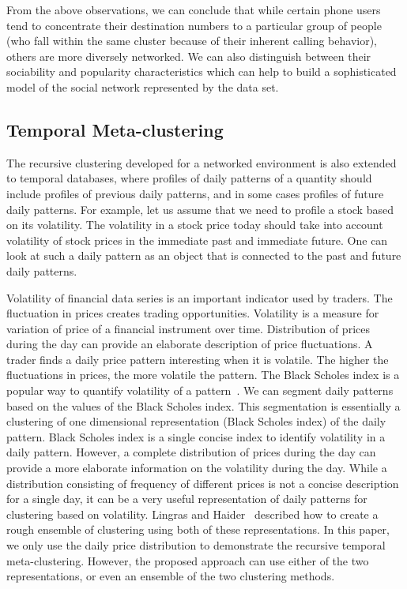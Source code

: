 \documentclass[oribibl]{llncs}
\begin{document}
From the above observations, we can conclude that while certain 
phone users tend to concentrate their destination numbers to 
a particular group of people (who fall within the same cluster 
because of their inherent calling behavior), others are more
diversely networked. We can also distinguish between their sociability
and popularity characteristics which can help to build a sophisticated
model of the social network represented by the data set. 

\subsection{Temporal Meta-clustering}
The recursive clustering developed for a networked environment is also extended to temporal databases, where profiles of daily patterns of a quantity should include profiles of previous daily patterns, and in some cases profiles of future daily patterns. For example, let us assume that we need to profile a stock based on its volatility. The volatility in a stock price today should take into account volatility of stock prices in the immediate past and immediate future. One can look at such a daily pattern as an object that is connected to the past and future daily patterns. 

Volatility of financial data series is an important indicator used by traders. The fluctuation in prices creates trading opportunities.  Volatility is a measure for variation of price of a financial instrument over time. Distribution of prices during the day can provide an elaborate description of price fluctuations.
A trader finds a daily price pattern interesting when it is volatile.
The higher the fluctuations in prices, the
more volatile the pattern.
The Black Scholes index is a popular way to quantify volatility of a pattern~\cite{BlackScholes1973}.
We can segment daily patterns based on the values of the Black Scholes
index.
This segmentation is essentially a clustering of one dimensional
representation (Black Scholes index) of the daily pattern.
Black Scholes index is a single concise index to identify volatility in
a daily pattern.
However, a complete distribution of prices during the day can provide
a more elaborate information on the volatility during the day.
While a distribution consisting of frequency of different prices
is not a concise description for a single day,
it can be a very useful representation of daily patterns for
clustering based on volatility.
Lingras and Haider~\cite{LingrasHaider2015} described how to create a rough ensemble of clustering
using both of these representations. In this paper, we only use the daily price distribution to demonstrate
the recursive temporal meta-clustering.
However, the proposed approach can use either of the two representations, or even an ensemble of the two clustering methods.
\end{document}
